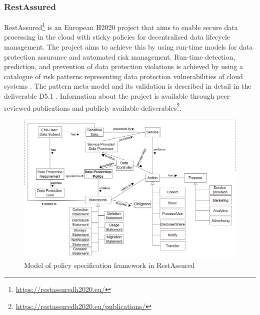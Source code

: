 \subsubsection{RestAssured}
RestAssured\footnote{\url{https://restassuredh2020.eu/}} is an European H2020 project that aims to enable secure data processing in the cloud with sticky policies for decentralised data lifecycle management.
The project aims to achieve this by using run-time models for data protection assurance and automated risk management. Run-time detection, prediction, and prevention of data protection violations is achieved by using a catalogue of risk patterns representing data protection vulnerabilities of cloud systems \cite{palm_modelling_2018,braubach_using_2018}. The pattern meta-model and its validation is described in detail in the deliverable D5.1 \cite{noauthor_d5.1.pdf_nodate}. Information about the project is available through peer-reviewed publications and publicly available deliverables\footnote{\url{https://restassuredh2020.eu/publications/}}.
\begin{figure}[htbp]
    \centering
    \includegraphics[width=\linewidth]{img/RestAssured_model.png}
    \caption{Model of policy specification framework in RestAssured \cite{noauthor_d6.1.pdf_nodate}}
    \label{fig:RestAssured-model}
\end{figure}

